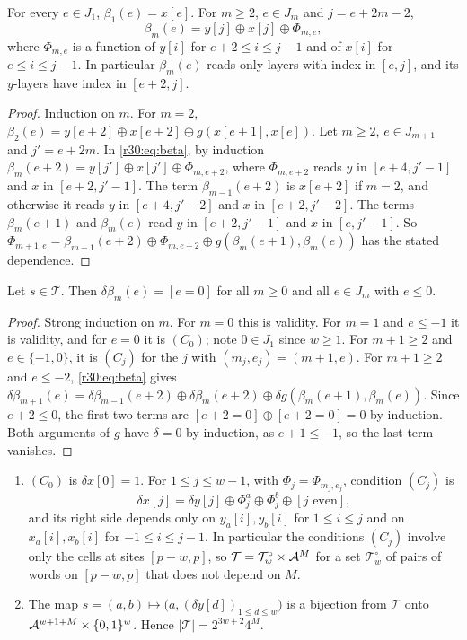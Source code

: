 \begin{lemma}\label{r30:lem:triangular}
For every $e\in J_1$, $\beta_1(e)=x[e]$. For $m\ge2$, $e\in J_m$ and $j=e+2m-2$,
\[
\beta_m(e)=y[j]\oplus x[j]\oplus\Phi_{m,e},
\]
where $\Phi_{m,e}$ is a function of $y[i]$ for $e+2\le i\le j-1$ and of $x[i]$ for $e\le i\le j-1$. In particular $\beta_m(e)$ reads only layers with index in $[e,j]$, and its $y$-layers have index in $[e+2,j]$.
\end{lemma}

\begin{proof}
Induction on $m$. For $m=2$, $\beta_2(e)=y[e+2]\oplus x[e+2]\oplus g(x[e+1],x[e])$. Let $m\ge2$, $e\in J_{m+1}$ and $j'=e+2m$. In \eqref{r30:eq:beta}, by induction $\beta_m(e+2)=y[j']\oplus x[j']\oplus\Phi_{m,e+2}$, where $\Phi_{m,e+2}$ reads $y$ in $[e+4,j'-1]$ and $x$ in $[e+2,j'-1]$. The term $\beta_{m-1}(e+2)$ is $x[e+2]$ if $m=2$, and otherwise it reads $y$ in $[e+4,j'-2]$ and $x$ in $[e+2,j'-2]$. The terms $\beta_m(e+1)$ and $\beta_m(e)$ read $y$ in $[e+2,j'-1]$ and $x$ in $[e,j'-1]$. So $\Phi_{m+1,e}=\beta_{m-1}(e+2)\oplus\Phi_{m,e+2}\oplus g(\beta_m(e+1),\beta_m(e))$ has the stated dependence.
\end{proof}

\begin{lemma}\label{r30:lem:propagate}
Let $s\in\mathcal{T}$. Then $\delta\beta_m(e)=[e=0]$ for all $m\ge0$ and all $e\in J_m$ with $e\le0$.
\end{lemma}

\begin{proof}
Strong induction on $m$. For $m=0$ this is validity. For $m=1$ and $e\le-1$ it is validity, and for $e=0$ it is $(C_0)$; note $0\in J_1$ since $w\ge1$. For $m+1\ge2$ and $e\in\{-1,0\}$, it is $(C_j)$ for the $j$ with $(m_j,e_j)=(m+1,e)$. For $m+1\ge2$ and $e\le-2$, \eqref{r30:eq:beta} gives $\delta\beta_{m+1}(e)=\delta\beta_{m-1}(e+2)\oplus\delta\beta_m(e+2)\oplus\delta g(\beta_m(e+1),\beta_m(e))$. Since $e+2\le0$, the first two terms are $[e+2=0]\oplus[e+2=0]=0$ by induction. Both arguments of $g$ have $\delta=0$ by induction, as $e+1\le-1$, so the last term vanishes.
\end{proof}

\begin{lemma}\label{r30:lem:explicit}
\begin{enumerate}
\item $(C_0)$ is $\delta x[0]=1$. For $1\le j\le w-1$, with $\Phi_j=\Phi_{m_j,e_j}$, condition $(C_j)$ is
\[
\delta x[j]=\delta y[j]\oplus\Phi^a_j\oplus\Phi^b_j\oplus[j\text{ even}],
\]
and its right side depends only on $y_a[i],y_b[i]$ for $1\le i\le j$ and on $x_a[i],x_b[i]$ for $-1\le i\le j-1$. In particular the conditions $(C_j)$ involve only the cells at sites $[p-w,p]$, so $\mathcal{T}=\mathcal{T}^\circ_w\times\mathcal{A}^M$ for a set $\mathcal{T}^\circ_w$ of pairs of words on $[p-w,p]$ that does not depend on $M$.
\item The map $s=(a,b)\mapsto\bigl(a,(\delta y[d])_{1\le d\le w}\bigr)$ is a bijection from $\mathcal{T}$ onto $\mathcal{A}^{w+1+M}\times\{0,1\}^w$. Hence $|\mathcal{T}|=2^{3w+2}4^M$.
\end{enumerate}
\end{lemma}

